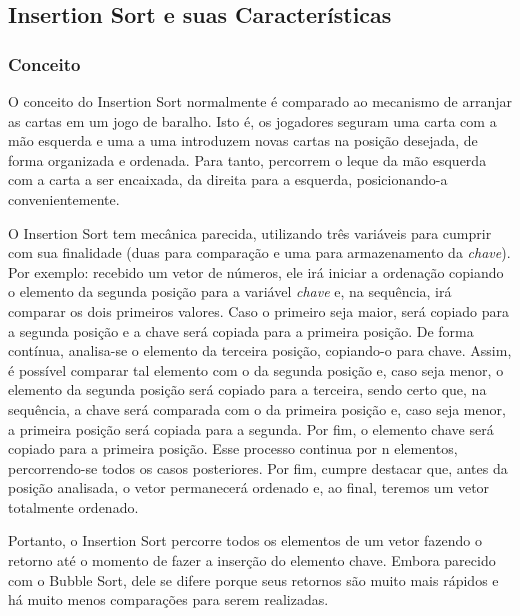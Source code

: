 \documentclass[a4paper, 12pt]{article}
\begin{document}
\vspace{0.9cm}
\subsection{Insertion Sort e suas Características}

\subsubsection{Conceito} 
\tab{} O conceito do Insertion Sort normalmente é comparado ao mecanismo de arranjar as cartas em um jogo de baralho. Isto é, os jogadores seguram uma carta com a mão esquerda e uma a uma introduzem novas cartas na posição desejada, de forma organizada e ordenada. Para tanto, percorrem o leque da mão esquerda com a carta a ser encaixada, da direita para a esquerda, posicionando-a convenientemente.

O Insertion Sort tem mecânica parecida, utilizando três variáveis para cumprir com sua finalidade (duas para comparação e uma para armazenamento da \textit{chave}). Por exemplo: recebido um vetor de números, ele irá iniciar a ordenação copiando o elemento da segunda posição para a variável \textit{chave} e, na sequência, irá comparar os dois primeiros valores. Caso o primeiro seja maior, será copiado para a segunda posição e a chave será copiada para a primeira posição. De forma contínua, analisa-se o elemento da terceira posição, copiando-o para chave. Assim, é possível comparar tal elemento com o da segunda posição e, caso seja menor, o elemento da segunda posição será copiado para a terceira, sendo certo que, na sequência, a chave será comparada com o da primeira posição e, caso seja menor, a primeira posição será copiada para a segunda. Por fim, o elemento chave será copiado para a primeira posição. Esse processo continua por n elementos, percorrendo-se todos os casos posteriores. Por fim, cumpre destacar que, antes da posição analisada, o vetor permanecerá ordenado e, ao final, teremos um vetor totalmente ordenado.

Portanto, o Insertion Sort percorre todos os elementos de um vetor fazendo o retorno até o momento de fazer a inserção do elemento chave. Embora parecido com o Bubble Sort, dele se difere porque seus retornos são muito mais rápidos e há muito menos comparações para serem realizadas.
\end{document}
